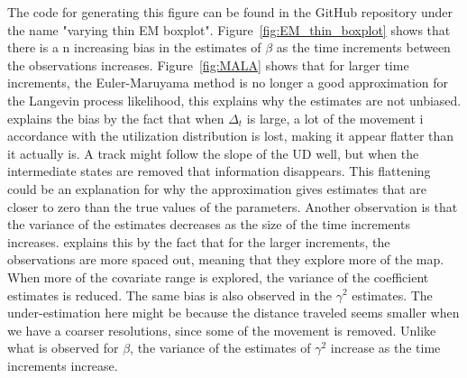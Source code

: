 The code for generating this figure can be found in the GitHub repository under the name "varying thin EM boxplot". Figure~\ref{fig:EM_thin_boxplot} shows that there is a n increasing bias in the estimates of $\beta$ as the time increments between the observations increases. Figure~\ref{fig:MALA} shows that for larger time increments, the Euler-Maruyama method is no longer a good approximation for the Langevin process likelihood, this explains why the estimates are not unbiased. \parencite{michelot_langevin_2019} explains the bias by the fact that when $\Delta_t$ is large, a lot of the movement i accordance with the utilization distribution is lost, making it appear flatter than it actually is. A track might follow the slope of the UD well, but when the intermediate states are removed that information disappears. This flattening could be an explanation for why the approximation gives estimates that are closer to zero than the true values of the parameters. Another observation is that the variance of the estimates decreases as the size of the time increments increases. \parencite{michelot_langevin_2019} explains this by the fact that for the larger increments, the observations are more spaced out, meaning that they explore more of the map. When more of the covariate range is explored, the variance of the coefficient estimates is reduced. The same bias is also observed in the $\gamma^2$ estimates. The under-estimation here might be because the distance traveled seems smaller when we have a coarser resolutions, since some of the movement is removed. Unlike what is observed for $\beta$, the variance of the estimates of $\gamma^2$ increase as the time increments increase.

